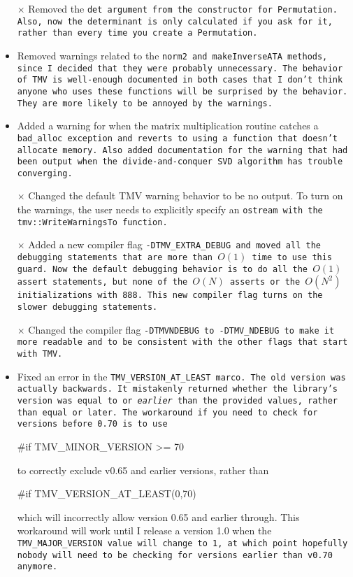 \begin{itemize}
\item[$\times$]
Removed the \tt{det} argument from the constructor for \tt{Permutation}.
Also, now the determinant is only calculated if you ask for it, rather 
than every time you create a \tt{Permutation}.

\item
Removed warnings related to the \tt{norm2} and \tt{makeInverseATA} methods, since I decided that they were probably unnecessary.  The behavior of TMV is well-enough documented in both cases that I don't think anyone who uses these functions will be surprised by the behavior.  They are more likely to be annoyed by the warnings.

\item 
Added a warning for when the matrix multiplication routine catches a \tt{bad\_alloc} exception and reverts to using a function that doesn't allocate memory.  Also added documentation for the warning that had been output when the divide-and-conquer SVD algorithm has trouble converging.

\item[$\times$]
Changed the default TMV warning behavior to be no output.  To turn on the warnings, the user needs to explicitly specify an \tt{ostream} with the \tt{tmv::WriteWarningsTo} function.

\item[$\times$]
Added a new compiler flag \tt{-DTMV\_EXTRA\_DEBUG} and moved all the debugging statements that are more than $O(1)$ time to use this guard.  Now the default debugging behavior is to do all the $O(1)$ assert statements, but none of the $O(N)$ asserts or the $O(N^2)$ initializations with \tt{888}.  This new compiler flag turns on the slower debugging statements.

\item[$\times$]
Changed the compiler flag \tt{-DTMVNDEBUG} to \tt{-DTMV\_NDEBUG} to make it more readable and to be consistent with the other flags that start with \tt{TMV}.

\item
Fixed an error in the \tt{TMV\_VERSION\_AT\_LEAST} marco.  The old version was actually backwards.  It mistakenly returned whether the library's version was equal to or {\em earlier} than the provided values, rather than equal or later.  The workaround if you need to check for versions before 0.70 is to use 
\begin{tmvcode}
#if TMV_MINOR_VERSION >= 70 
\end{tmvcode}
to correctly exclude v0.65 and earlier versions, rather than
\begin{tmvcode}
#if TMV_VERSION_AT_LEAST(0,70)
\end{tmvcode}
which will incorrectly allow version 0.65 and earlier through.  This workaround will work until I release a version 1.0 when the \tt{TMV\_MAJOR\_VERSION} value will change to 1, at which point hopefully nobody will need to be checking for versions earlier than v0.70 anymore.


\end{itemize}
